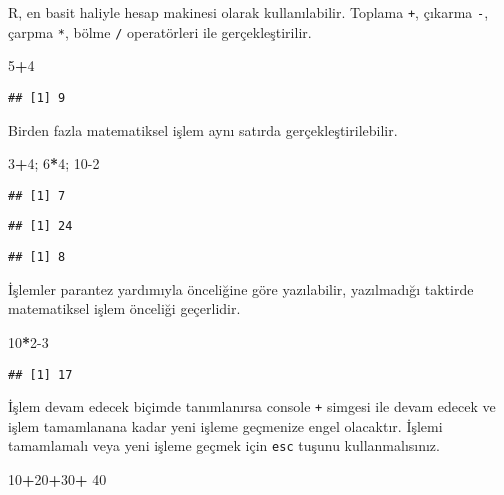 \documentclass[
]{book}
\newenvironment{Shaded}{\begin{snugshade}}{\end{snugshade}}
\newcommand{\DecValTok}[1]{\textcolor[rgb]{0.00,0.00,0.81}{#1}}
\newcommand{\NormalTok}[1]{#1}
\newcommand{\OperatorTok}[1]{\textcolor[rgb]{0.81,0.36,0.00}{\textbf{#1}}}
\newcommand{\StringTok}[1]{\textcolor[rgb]{0.31,0.60,0.02}{#1}}
\begin{document}
R, en basit haliyle hesap makinesi olarak kullanılabilir. Toplama \texttt{+}, çıkarma \texttt{-}, çarpma \texttt{*}, bölme \texttt{/} operatörleri ile gerçekleştirilir.

\begin{Shaded}
\begin{Highlighting}[]
\DecValTok{5}\OperatorTok{+}\DecValTok{4}
\end{Highlighting}
\end{Shaded}

\begin{verbatim}
## [1] 9
\end{verbatim}

Birden fazla matematiksel işlem aynı satırda gerçekleştirilebilir.

\begin{Shaded}
\begin{Highlighting}[]
\DecValTok{3}\OperatorTok{+}\DecValTok{4}\NormalTok{; }\DecValTok{6}\OperatorTok{*}\DecValTok{4}\NormalTok{; }\DecValTok{10-2}
\end{Highlighting}
\end{Shaded}

\begin{verbatim}
## [1] 7
\end{verbatim}

\begin{verbatim}
## [1] 24
\end{verbatim}

\begin{verbatim}
## [1] 8
\end{verbatim}

İşlemler parantez yardımıyla önceliğine göre yazılabilir, yazılmadığı taktirde matematiksel işlem önceliği geçerlidir.

\begin{Shaded}
\begin{Highlighting}[]
\DecValTok{10}\OperatorTok{*}\DecValTok{2-3}
\end{Highlighting}
\end{Shaded}

\begin{verbatim}
## [1] 17
\end{verbatim}

İşlem devam edecek biçimde tanımlanırsa console \texttt{+} simgesi ile devam edecek ve işlem tamamlanana kadar yeni işleme geçmenize engel olacaktır. İşlemi tamamlamalı veya yeni işleme geçmek için \texttt{esc} tuşunu kullanmalısınız.

\begin{Shaded}
\begin{Highlighting}[]
\DecValTok{10}\OperatorTok{+}\DecValTok{20}\OperatorTok{+}\DecValTok{30}\OperatorTok{+}
\StringTok{  }\DecValTok{40}
\end{Highlighting}
\end{Shaded}
\end{document}

